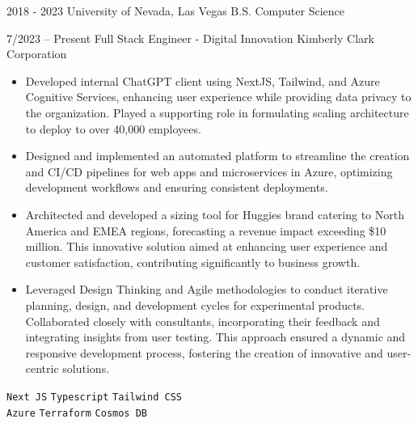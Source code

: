 \documentclass[9pt]{developercv} %
\begin{document}
\vspace{-10 pt}
\begin{entrylist}
    \entry
		{2018 - 2023}
        {University of Nevada, Las Vegas}
        {}
		{B.S. Computer Science}
\end{entrylist}

\vspace{-10 pt}
\begin{entrylist}
	\entry
        {7/2023 -- Present}
		{Full Stack Engineer - Digital Innovation}
		{Kimberly Clark Corporation}
		{\vspace{-10pt}
        \begin{itemize}[noitemsep,topsep=0pt,parsep=0pt,partopsep=0pt, leftmargin=-1pt]
            \item Developed internal ChatGPT client using NextJS, Tailwind, and Azure Cognitive Services, enhancing user experience while providing data privacy to the organization. Played a supporting role in formulating scaling architecture to deploy to over 40,000 employees.
            \item Designed and implemented an automated platform to streamline the creation and CI/CD pipelines for web apps and microservices in Azure, optimizing development workflows and ensuring consistent deployments.
            \item Architected and developed a sizing tool for Huggies brand catering to North America and EMEA regions, forecasting a revenue impact exceeding \$10 million. This innovative solution aimed at enhancing user experience and customer satisfaction, contributing significantly to business growth.
            \item Leveraged Design Thinking and Agile methodologies to conduct iterative planning, design, and development cycles for experimental products. Collaborated closely with consultants, incorporating their feedback and integrating insights from user testing. This approach ensured a dynamic and responsive development process, fostering the creation of innovative and user-centric solutions.
\vspace{1mm}
        \end{itemize} 
        \texttt{Next JS} \slashsep \texttt{Typescript} \slashsep \texttt{Tailwind CSS} \\ \texttt{Azure} \slashsep \texttt{Terraform} \slashsep \texttt{Cosmos DB}}
        

\end{entrylist}
\end{document}
